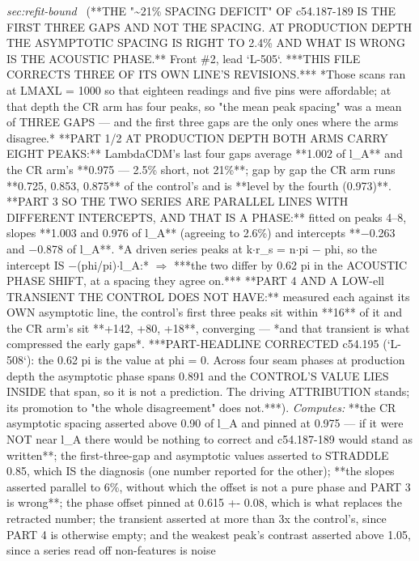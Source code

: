 \begin{description}
\textit{sec:refit-bound} \ (**THE "\textasciitilde{}21\% SPACING DEFICIT" OF c54.187-189 IS THE FIRST THREE GAPS AND NOT THE SPACING. AT PRODUCTION DEPTH THE ASYMPTOTIC SPACING IS RIGHT TO 2.4\% AND WHAT IS WRONG IS THE ACOUSTIC PHASE.** Front \#2, lead `L-505`.  ***THIS FILE CORRECTS THREE OF ITS OWN LINE'S REVISIONS.*** *Those scans ran at LMAXL = 1000 so that eighteen readings and five pins were affordable; at that depth the CR arm has four peaks, so "the mean peak spacing" was a mean of THREE GAPS --- and the first three gaps are the only ones where the arms disagree.* **PART 1/2 AT PRODUCTION DEPTH BOTH ARMS CARRY EIGHT PEAKS:** LambdaCDM's last four gaps average **1.002 of l\_A** and the CR arm's **0.975 --- 2.5\% short, not 21\%**; gap by gap the CR arm runs **0.725, 0.853, 0.875** of the control's and is **level by the fourth (0.973)**. **PART 3 SO THE TWO SERIES ARE PARALLEL LINES WITH DIFFERENT INTERCEPTS, AND THAT IS A PHASE:** fitted on peaks 4--8, slopes **1.003 and 0.976 of l\_A** (agreeing to 2.6\%) and intercepts **\ensuremath{-}0.263 and \ensuremath{-}0.878 of l\_A**. *A driven series peaks at k\ensuremath{\cdot}r\_s = n\ensuremath{\cdot}pi \ensuremath{-} phi, so the intercept IS \ensuremath{-}(phi/pi)\ensuremath{\cdot}l\_A:* \ensuremath{\Rightarrow} ***the two differ by 0.62 pi in the ACOUSTIC PHASE SHIFT, at a spacing they agree on.*** **PART 4 AND A LOW-ell TRANSIENT THE CONTROL DOES NOT HAVE:** measured each against its OWN asymptotic line, the control's first three peaks sit within **16** of it and the CR arm's sit **+142, +80, +18**, converging --- *and that transient is what compressed the early gaps*.  ***PART-HEADLINE CORRECTED c54.195 (`L-508`): the 0.62 pi is the value at phi = 0. Across four seam phases at production depth the asymptotic phase spans 0.891 and the CONTROL'S VALUE LIES INSIDE that span, so it is not a prediction. The driving ATTRIBUTION stands; its promotion to "the whole disagreement" does not.***). 
\emph{Computes:} **the CR asymptotic spacing asserted above 0.90 of l\_A and pinned at 0.975 --- if it were NOT near l\_A there would be nothing to correct and c54.187-189 would stand as written**; the first-three-gap and asymptotic values asserted to STRADDLE 0.85, which IS the diagnosis (one number reported for the other); **the slopes asserted parallel to 6\%, without which the offset is not a pure phase and PART 3 is wrong**; the phase offset pinned at 0.615 +- 0.08, which is what replaces the retracted number; the transient asserted at more than 3x the control's, since PART 4 is otherwise empty; and the weakest peak's contrast asserted above 1.05, since a series read off non-features is noise

\end{description}
